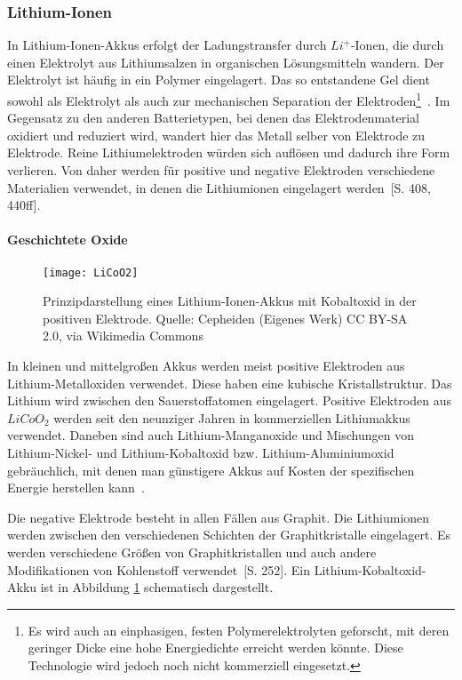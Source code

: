 \subsubsection{Lithium-Ionen}
In Lithium-Ionen-Akkus erfolgt der Ladungstransfer durch $Li^+$-Ionen, die durch einen Elektrolyt aus Lithiumsalzen in organischen Lösungsmitteln wandern. Der Elektrolyt ist häufig in ein Polymer eingelagert. Das so entstandene Gel dient sowohl als Elektrolyt als auch zur mechanischen Separation der Elektroden\footnote{Es wird auch an einphasigen, festen Polymerelektrolyten geforscht, mit deren geringer Dicke eine hohe Energiedichte erreicht werden könnte. Diese Technologie wird jedoch noch nicht kommerziell eingesetzt.}~\cite{xu2004nonaqueous}. Im Gegensatz zu den anderen Batterietypen, bei denen das Elektrodenmaterial oxidiert und reduziert wird, wandert hier das Metall selber von Elektrode zu Elektrode. Reine Lithiumelektroden würden sich auflösen und dadurch ihre Form verlieren. Von daher werden für positive und negative Elektroden verschiedene Materialien verwendet, in denen die Lithiumionen eingelagert werden~\cite{KiehneBattery}[S. 408, 440ff]. 

\paragraph{Geschichtete Oxide}

\begin{figure}\centering
	\texttt{[image: LiCoO2]}
	\caption[Prinzipdarstellung eines Lithium-Ionen-Akkus]{Prinzipdarstellung eines Lithium-Ionen-Akkus mit Kobaltoxid in der positiven Elektrode. Quelle: Cepheiden (Eigenes Werk) CC BY-SA 2.0, via Wikimedia Commons}
	\label{abb_LiCoO2}
\end{figure}

In kleinen und mittelgroßen Akkus werden meist positive Elektroden aus Lithium-Metalloxiden verwendet. Diese haben eine kubische Kristallstruktur. Das Lithium wird zwischen den Sauerstoffatomen eingelagert. Positive Elektroden aus $LiCoO_2$ werden seit den neunziger Jahren in kommerziellen Lithiumakkus verwendet. Daneben sind auch Lithium-Manganoxide und Mischungen von Lithium-Nickel- und Lithium-Kobaltoxid bzw. Lithium-Aluminiumoxid gebräuchlich, mit denen man günstigere Akkus auf Kosten der spezifischen Energie herstellen kann~\cite{whittingham2004lithium}.

Die negative Elektrode besteht in allen Fällen aus Graphit. Die Lithiumionen werden zwischen den verschiedenen Schichten der Graphitkristalle eingelagert. Es werden verschiedene Größen von Graphitkristallen und auch andere Modifikationen von Kohlenstoff verwendet~\cite{Sterner:2014}[S. 252]. Ein Lithium-Kobaltoxid-Akku ist in Abbildung \ref{abb_LiCoO2} schematisch dargestellt.

